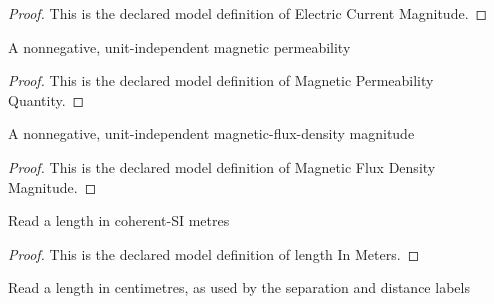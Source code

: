 \begin{proof}
  This is the declared model definition of Electric Current Magnitude.
\end{proof}
\begin{definition}
  \label{def:physics:phyx-mini-0960:phyxminiproblems-problemphyxmini0960-magneticpermeabilityquantity}
  A nonnegative, unit-independent magnetic permeability
\end{definition}
\begin{proof}
  This is the declared model definition of Magnetic Permeability Quantity.
\end{proof}
\begin{definition}
  \label{def:physics:phyx-mini-0960:phyxminiproblems-problemphyxmini0960-magneticfluxdensitymagnitude}
  A nonnegative, unit-independent magnetic-flux-density magnitude
\end{definition}
\begin{proof}
  This is the declared model definition of Magnetic Flux Density Magnitude.
\end{proof}
\begin{definition}
  \label{def:physics:phyx-mini-0960:phyxminiproblems-problemphyxmini0960-lengthinmeters}
  Read a length in coherent-SI metres
\end{definition}
\begin{proof}
  This is the declared model definition of length In Meters.
\end{proof}
\begin{definition}
  \label{def:physics:phyx-mini-0960:phyxminiproblems-problemphyxmini0960-lengthincentimeters}
  Read a length in centimetres, as used by the separation and distance labels
\end{definition}
